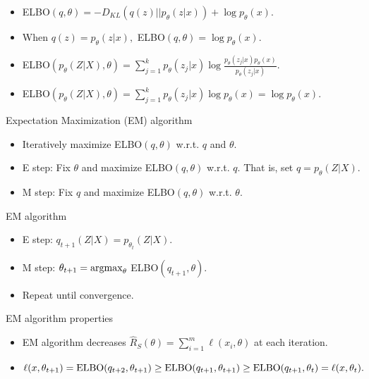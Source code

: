 \documentclass[final]{beamer}
\begin{document}
\begin{frame}
	\begin{itemize}
		\item ELBO$(q, \theta) = - D_{KL}(q(z) || p_\theta(z | x)) + \log p_\theta(x).$
		\pause
		\item When $q(z) = p_\theta(z | x),$ ELBO$(q, \theta) = \log p_\theta(x).$
		\pause
		\item ELBO$(p_\theta(Z|X), \theta) = \sum_{j=1}^k p_\theta(z_j|x) \log \frac{p_\theta(z_j|x)p_\theta(x)}{p_\theta(z_j|x)}.$
		\pause
	\item ELBO$(p_\theta(Z|X), \theta) = \sum_{j=1}^k p_\theta(z_j|x) \log p_\theta(x) = \log p_\theta(x).$
	\end{itemize}
\end{frame}
\begin{frame}{Expectation Maximization (EM) algorithm}
	\begin{itemize}
		\item Iteratively maximize ELBO$(q, \theta)$ w.r.t. $q$ and $\theta.$
		\pause
		\item E step: Fix $\theta$ and maximize ELBO$(q, \theta)$ w.r.t. $q.$ That is, set $q = p_\theta(Z|X).$
		\pause
		\item M step: Fix $q$ and maximize ELBO$(q, \theta)$ w.r.t. $\theta.$

	\end{itemize}
\end{frame}
\begin{frame}{EM algorithm}
	\begin{itemize}
		\item E step: $q_{t+1}(Z|X) = p_{\theta_t}(Z|X).$
		\pause
	\item M step: $\theta_{t+1} = {\rm argmax}_\theta$ ELBO$(q_{t+1}, \theta).$
		\pause
		\item Repeat until convergence.
	\end{itemize}
\end{frame}
\begin{frame}{EM algorithm properties}
	\begin{itemize}
		\item EM algorithm decreases $\hat{R}_S(\theta) = \sum_{i=1}^m \ell(x_i, \theta)$ at each iteration.
		\item $\ell(x, \theta_{t+1}) = {\rm ELBO}(q_{t+2}, \theta_{t+1}) \geq {\rm ELBO}(q_{t+1}, \theta_{t+1}) \geq {\rm ELBO}(q_{t+1}, \theta_t) = \ell(x, \theta_t).$

	\end{itemize}
\end{frame}
\end{document}
